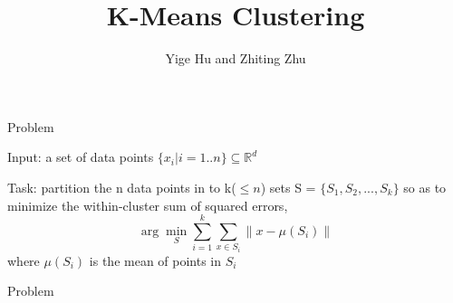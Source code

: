 \documentclass[
nopagebreaks,
style=tycja,
fleqn]{powerdot}
\title{K-Means Clustering}
\author{Yige Hu and Zhiting Zhu}
\date{}
\begin{document}
\maketitle

\begin{slide} {Problem}
\begin{compactitem}
\item{Input: a set of data points $\{x_i|i = 1..n\} \subseteq
  \mathbb{R}^d $}
\item{Task: partition the n data points
in to k($\leq n$) sets S = $\{S_1, S_2, ..., S_k\}$ so as to minimize
the within-cluster sum of squared
errors, $$\arg\min_{S}\sum_{i=1}^{k}\sum_{x \in S_i} \parallel x -
\mu(S_i)\parallel$$ where $\mu(S_i)$ is the mean of points in $S_i$}
\end{compactitem}

\end{slide}

\begin{slide} {Problem}

\end{slide}
\end{document}
